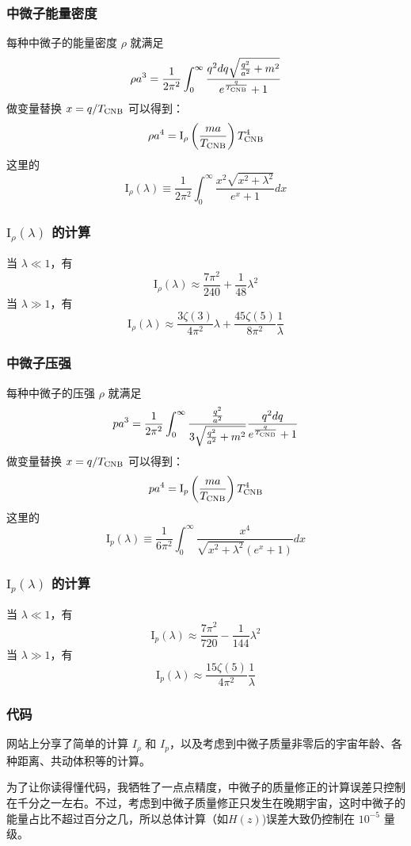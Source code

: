 \documentclass[CJK,13pt]{beamer}
\begin{document}
  \begin{frame}
    \frametitle{中微子能量密度}
    每种中微子的能量密度 $\rho$ 就满足
    $$\rho a^3 = \frac{1}{2\pi^2}\int_0^\infty \frac{q^2dq\sqrt{\frac{q^2}{a^2}+m^2}}{e^{\frac{q}{T_{\rm CNB}}}+1}$$    
    做变量替换 $x = q/T_{\rm CNB}$ 可以得到：
    $$\rho a^4 = \mathrm{I}_\rho\left(\frac{ma}{T_{\rm CNB}}\right) T^4_{\rm CNB} $$
    这里的
    $$ \mathrm{I}_\rho(\lambda) \equiv  \frac{1}{2\pi^2}\int_0^\infty \frac{x^2\sqrt{x^2+\lambda^2}}{e^x+1}dx$$    
  \end{frame}

  \begin{frame}
    \frametitle{$\mathrm{I}_\rho(\lambda)$ 的计算}
    当 $\lambda \ll 1$，有
    $$ \mathrm{I}_\rho(\lambda) \approx \frac{7\pi^2}{240} + \frac{1}{48}\lambda^2 $$
    当 $\lambda \gg 1$，有
    $$ \mathrm{I}_\rho(\lambda) \approx \frac{3\zeta(3)}{4\pi^2}\lambda + \frac{45\zeta(5)}{8\pi^2}\frac{1}{\lambda} $$ %
  \end{frame}


  \begin{frame}
    \frametitle{中微子压强}
    每种中微子的压强 $\rho$ 就满足
    $$pa^3  = \frac{1}{2\pi^2}\int_0^\infty \frac{\frac{q^2}{a^2}}{3\sqrt{\frac{q^2}{a^2}+m^2}}\frac{q^2dq}{e^{\frac{q}{T_{\rm CNB}}}+1}$$    
    做变量替换 $x = q/T_{\rm CNB}$ 可以得到：
    $$ pa^4 = \mathrm{I}_p\left(\frac{ma}{T_{\rm CNB}}\right) T^4_{\rm CNB} $$
    这里的
    $$ \mathrm{I}_p(\lambda) \equiv  \frac{1}{6\pi^2}\int_0^\infty \frac{x^4}{\sqrt{x^2+\lambda^2}\left(e^x+1\right)}dx$$    
  \end{frame}

  \begin{frame}
    \frametitle{$\mathrm{I}_p(\lambda)$ 的计算}
    当 $\lambda \ll 1$，有
    $$ \mathrm{I}_p(\lambda) \approx \frac{7\pi^2}{720} - \frac{1}{144}\lambda^2 $$
    当 $\lambda \gg 1$，有
    $$ \mathrm{I}_p(\lambda) \approx \frac{15\zeta(5)}{4\pi^2}\frac{1}{\lambda} $$ %

  \end{frame}


  \begin{frame}
    \frametitle{代码}
    网站上分享了简单的计算 $I_\rho$ 和 $I_p$，以及考虑到中微子质量非零后的宇宙年龄、各种距离、共动体积等的计算。


    为了让你读得懂代码，我牺牲了一点点精度，中微子的质量修正的计算误差只控制在千分之一左右。不过，考虑到中微子质量修正只发生在晚期宇宙，这时中微子的能量占比不超过百分之几，所以总体计算（如$H(z)$)误差大致仍控制在 $10^{-5}$ 量级。
  \end{frame}
  
  
    \ech
\end{document}
